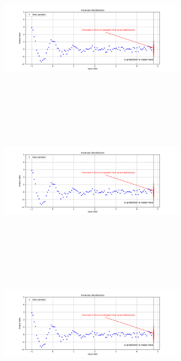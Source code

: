 \documentclass[12pt,a4paper,twoside]{scrartcl}
\numberwithin{equation}{section}
\begin{document}
\begin{figure}[H]
  \centering

  \begin{subfigure}{0.32\textwidth}
    \includegraphics[width=\textwidth,height=7cm]{figures/forecast.png}%
    \label{fig:y equals x}
  \end{subfigure}
  \begin{subfigure}{0.32\textwidth}
    \includegraphics[width=\textwidth,height=7cm]{figures/forecast.png}%
    \label{fig:y equals x}
  \end{subfigure}
  \begin{subfigure}{0.32\textwidth}
    \includegraphics[width=\textwidth,height=7cm]{figures/forecast.png}%
    \label{fig:y equals x}
  \end{subfigure}


\end{figure}
\end{document}
